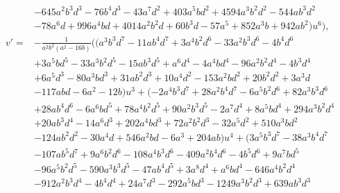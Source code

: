 \documentclass{gtpart}
\theoremstyle{definition}
\theoremstyle{remark}
\begin{document}
\begin{equation*}
\begin{split}
      & - 645 a^2 b^3 d^3 - 76 b^4 d^3 - 43 a^7 d^2 + 403 a^5 b d^2 + 4594 a^3 b^2 d^2 - 544 a b^3 d^2 \\
      & - 78 a^6 d + 996 a^4 b d + 4014 a^2 b^2 d + 60 b^3 d - 57 a^5 + 852 a^3 b + 942 a b^2) u^6 \big), \\
 v' = & -\frac{1}{a^2 b^2 (a^2 - 16 b)} \big( (a^3 b^3 d^7 - 11 a b^4 d^7 + 3 a^4 b^2 d^6 - 33 a^2 b^3 d^6 - 4 b^4 d^6 \\
      & + 3 a^5 b d^5 - 33 a^3 b^2 d^5 - 15 a b^3 d^5 + a^6 d^4 - 4 a^4 b d^4 - 96 a^2 b^2 d^4 - 4 b^3 d^4 \\
      & + 6 a^5 d^3 - 80 a^3 b d^3 + 31 a b^2 d^3 + 10 a^4 d^2 - 153 a^2 b d^2 + 20 b^2 d^2 + 3 a^3 d \\
      & - 117 a b d - 6 a^2 - 12 b) u^3 + (-2 a^4 b^3 d^7 + 28 a^2 b^4 d^7 - 6 a^5 b^2 d^6 + 82 a^3 b^3 d^6 \\
      & + 28 a b^4 d^6 - 6 a^6 b d^5 + 78 a^4 b^2 d^5 + 90 a^2 b^3 d^5 - 2 a^7 d^4 + 8 a^5 b d^4 + 294 a^3 b^2 d^4 \\
      & + 20 a b^3 d^4 - 14 a^6 d^3 + 202 a^4 b d^3 + 72 a^2 b^2 d^3 - 32 a^5 d^2 + 510 a^3 b d^2 \\
      & - 124 a b^2 d^2 - 30 a^4 d + 546 a^2 b d - 6 a^3 + 204 a b) u^4 + (3 a^5 b^3 d^7 - 38 a^3 b^4 d^7 \\
      & - 107 a b^5 d^7 + 9 a^6 b^2 d^6 - 108 a^4 b^3 d^6 - 409 a^2 b^4 d^6 - 4 b^5 d^6 + 9 a^7 b d^5 \\
      & - 96 a^5 b^2 d^5 - 590 a^3 b^3 d^5 - 47 a b^4 d^5 + 3 a^8 d^4 + a^6 b d^4 - 646 a^4 b^2 d^4 \\
      & - 912 a^2 b^3 d^4 - 4 b^4 d^4 + 24 a^7 d^3 - 292 a^5 b d^3 - 1249 a^3 b^2 d^3 + 639 a b^3 d^3 
\end{split}
\end{equation*}
\end{document}
